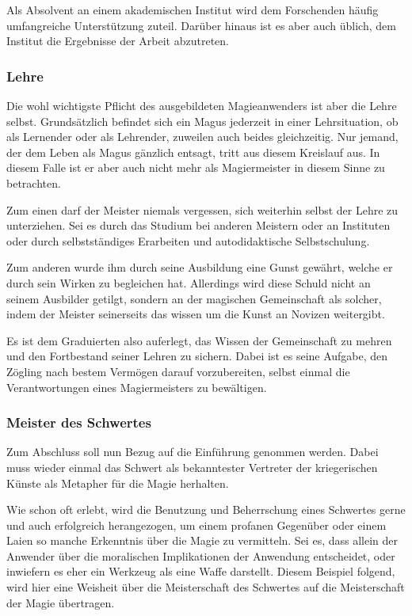 \documentclass[a5paper,8pt]{book}
\begin{document}
Als Absolvent an einem akademischen Institut wird dem Forschenden häufig
umfangreiche Unterstützung zuteil. Darüber hinaus ist es aber auch üblich, dem
Institut die Ergebnisse der Arbeit abzutreten.

\subsubsection*{Lehre}
Die wohl wichtigste Pflicht des ausgebildeten Magieanwenders ist aber die Lehre
selbst. Grundsätzlich befindet sich ein Magus jederzeit in einer Lehrsituation,
ob als Lernender oder als Lehrender, zuweilen auch beides gleichzeitig. Nur
jemand, der dem Leben als Magus gänzlich entsagt, tritt aus diesem Kreislauf
aus. In diesem Falle ist er aber auch nicht mehr als Magiermeister in diesem
Sinne zu betrachten.

Zum einen darf der Meister niemals vergessen, sich weiterhin selbst der
Lehre zu unterziehen. Sei es durch das Studium bei anderen Meistern oder an
Instituten oder durch selbstständiges Erarbeiten und autodidaktische
Selbstschulung.

Zum anderen wurde ihm durch seine Ausbildung eine Gunst gewährt, welche er
durch sein Wirken zu begleichen hat. Allerdings wird diese Schuld nicht an
seinem Ausbilder getilgt, sondern an der magischen Gemeinschaft als solcher,
indem der Meister seinerseits das wissen um die Kunst an Novizen weitergibt.

Es ist dem Graduierten also auferlegt, das Wissen der Gemeinschaft zu mehren
und den Fortbestand seiner Lehren zu sichern. Dabei ist es seine Aufgabe, den
Zögling nach bestem Vermögen darauf vorzubereiten, selbst einmal die
Verantwortungen eines Magiermeisters zu bewältigen.

\subsubsection*{Meister des Schwertes}
Zum Abschluss soll nun Bezug auf die Einführung genommen werden. Dabei muss
wieder einmal das Schwert als bekanntester Vertreter der kriegerischen Künste als
Metapher für die Magie herhalten. 

Wie schon oft erlebt, wird die Benutzung und Beherrschung eines Schwertes gerne
und auch erfolgreich herangezogen, um einem profanen Gegenüber oder einem Laien
so manche Erkenntnis über die Magie zu vermitteln. Sei es, dass allein der
Anwender über die moralischen Implikationen der Anwendung entscheidet, oder
inwiefern es eher ein Werkzeug als eine Waffe darstellt. Diesem Beispiel folgend,
wird hier eine Weisheit über die Meisterschaft des Schwertes auf die
Meisterschaft der Magie übertragen.
\end{document}
